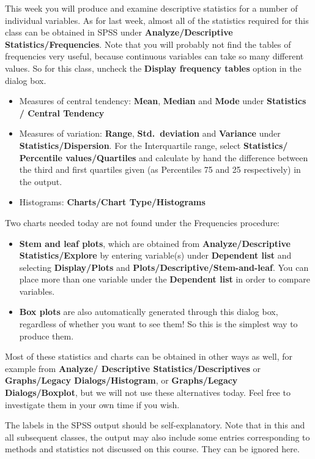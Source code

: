 \vspace*{-2ex}
This week you will produce and examine descriptive statistics for a number of
individual variables.
As for last week, almost all of the statistics
required for this class can be obtained in SPSS
under \textbf{Analyze/Descriptive Statistics/Frequencies}. Note that you will probably
not find the tables of frequencies very useful, because continuous variables can take
so many different values. So for this class, uncheck the \textbf{Display frequency tables}
option in the dialog box.
\begin{itemize}
\item
Measures of central tendency: \textbf{Mean}, \textbf{Median} and
\textbf{Mode} under \textbf{Statistics / Central Tendency}
\item
Measures of variation: \textbf{Range}, \textbf{Std.\ deviation} and
\textbf{Variance}
under \textbf{Statistics/Dispersion}. For the Interquartile
range, select \textbf{Statistics/ Percentile values/Quartiles}
and calculate by hand the difference between the third and first quartiles
given (as Percentiles 75 and 25 respectively) in the output.
\item
Histograms: \textbf{Charts/Chart Type/Histograms}
\end{itemize}
Two charts needed today
are not found under the Frequencies procedure:
\begin{itemize}
\item
\textbf{Stem and leaf plots}, which
are obtained from \textbf{Analyze/Descriptive Statistics/Explore} by
entering variable(s) under \textbf{Dependent list} and selecting
\textbf{Display/Plots} and \textbf{Plots/Descriptive/Stem-and-leaf}. You can place
 more than one variable under the \textbf{Dependent list} in order to compare variables.
\item
\textbf{Box plots} are also automatically generated through this dialog box,
regardless of whether you want to see them! So this is the simplest way
to produce them.
\end{itemize}
Most of these statistics and charts can be obtained in other ways as well, for example from
\textbf{Analyze/ Descriptive Statistics/Descriptives} or
\textbf{Graphs/Legacy Dialogs/Histogram}, or \textbf{Graphs/Legacy Dialogs/Boxplot},
but we will not use these alternatives today. Feel free to investigate them in your own time if
you wish.

The labels in the SPSS output should be self-explanatory. Note that in
this and all subsequent classes, the output may also include some
entries corresponding to methods and statistics not discussed on this
course. They can be ignored here.

